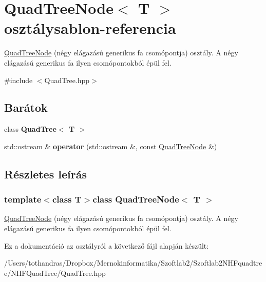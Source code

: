 \hypertarget{class_quad_tree_node}{\section{Quad\-Tree\-Node$<$ T $>$ osztálysablon-\/referencia}
\label{class_quad_tree_node}
}


\hyperlink{class_quad_tree_node}{Quad\-Tree\-Node} (négy elágazású generikus fa csomópontja) osztály. A négy elágazású generikus fa ilyen csomópontokból épül fel.  




{\ttfamily \#include $<$Quad\-Tree.\-hpp$>$}

\subsection*{Barátok}
\begin{DoxyCompactItemize}
\item 
\hypertarget{class_quad_tree_node_a86cf92e1bfbee775eead8ccd7dbdc1f8}{class {\bfseries Quad\-Tree$<$ T $>$}}\label{class_quad_tree_node_a86cf92e1bfbee775eead8ccd7dbdc1f8}

\item 
\hypertarget{class_quad_tree_node_ac25992d68676ddc77fb4702cc5f37338}{std\-::ostream \& {\bfseries operator} (std\-::ostream \&, const \hyperlink{class_quad_tree_node}{Quad\-Tree\-Node} \&)}\label{class_quad_tree_node_ac25992d68676ddc77fb4702cc5f37338}

\end{DoxyCompactItemize}


\subsection{Részletes leírás}
\subsubsection*{template$<$class T$>$class Quad\-Tree\-Node$<$ T $>$}

\hyperlink{class_quad_tree_node}{Quad\-Tree\-Node} (négy elágazású generikus fa csomópontja) osztály. A négy elágazású generikus fa ilyen csomópontokból épül fel. 

Ez a dokumentáció az osztályról a következő fájl alapján készült\-:\begin{DoxyCompactItemize}
\item 
/\-Users/tothandras/\-Dropbox/\-Mernokinformatika/\-Szoftlab2/\-Szoftlab2\-N\-H\-Fquadtree/\-N\-H\-F\-Quad\-Tree/Quad\-Tree.\-hpp\end{DoxyCompactItemize}

